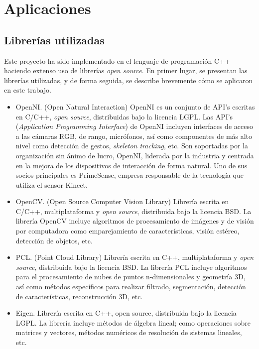 
\chapter{Aplicaciones}

\section{Librerías utilizadas}

Este proyecto ha sido implementado en el lenguaje de programación C++ \cite{cplusplus} haciendo extenso uso de librerías \textit{open source}. En primer lugar, se presentan las librerías utilizadas, y de forma seguida, se describe brevemente cómo se aplicaron en este trabajo.

\begin{itemize}

\item OpenNI. (Open Natural Interaction) OpenNI es un conjunto de API’s escritas en C/C++, \textit{open source}, distribuidas bajo la licencia LGPL. Las API's (\textit{Application Programming Interface}) de OpenNI incluyen interfaces de acceso a las cámaras RGB, de rango, micrófonos, así como componentes de más alto nivel como detección de gestos, \textit{skeleton tracking}, etc.
Son soportadas por la organización sin ánimo de lucro, OpenNI, liderada por la industria y centrada en la mejora de los dispositivos de interacción de forma natural. Uno de sus socios principales es PrimeSense, empresa responsable de la tecnología que utiliza el sensor Kinect. 

\item OpenCV. (Open Source Computer Vision Library) Librería escrita en C/C++, multiplataforma y \textit{open source}, distribuida bajo la licencia BSD. La librería OpenCV incluye algoritmos de procesamiento de imágenes y de visión por computadora como emparejamiento de características, visión estéreo, detección de objetos, etc.

\item PCL. (Point Cloud Library) Librería escrita en C++, multiplataforma y \textit{open source}, distribuida bajo la licencia BSD. La librería PCL incluye algoritmos para el procesamiento de nubes de puntos n-dimensionales y geometría 3D, así como métodos específicos para realizar filtrado, segmentación, detección de características, reconstrucción 3D, etc.

\item Eigen. Librería escrita en C++, open source, distribuida bajo la licencia LGPL. La librería incluye métodos de álgebra lineal; como operaciones sobre matrices y vectores, métodos numéricos de resolución de sistemas lineales, etc.


\end{itemize}
